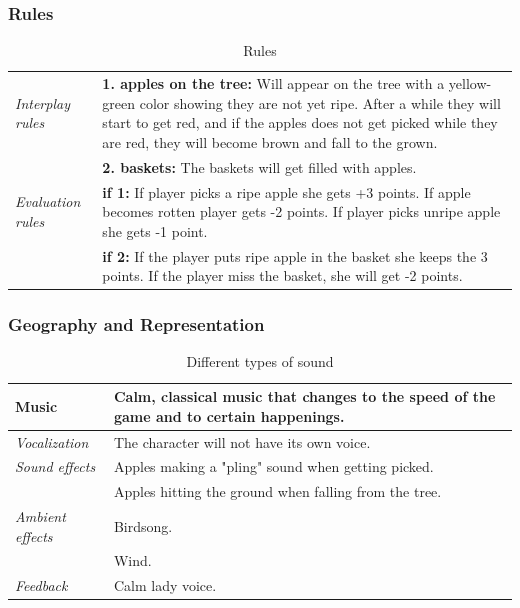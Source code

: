 \subsubsection{Rules} 

\begin{table} [H]
\centering
    \begin{tabular}{|p{}|p{}|}
       \hline
        \emph{Interplay rules} &  \textbf{1. apples on the tree:} Will appear on the tree with a yellow-green color showing they are not yet ripe. After a while they will start to get red, and if the apples does not get picked while they are red, they will become brown and fall to the grown. \\ \cline{2-2}
	     & \textbf{2. baskets:} The baskets will get filled with apples. \\ \hline
	     \emph{Evaluation rules} & \textbf{if 1:} If player picks a ripe apple she gets +3 points. If apple becomes rotten player gets  -2 points. If player picks unripe apple she gets -1 point. \\ \cline{2-2}
	       & \textbf{if 2:} If the player puts ripe apple in the basket she keeps the 3 points. If the player miss the basket, she will get -2 points.  \\ \hline
    \end{tabular}
    \caption[Rules for the "Apple Picking" game]{Rules}
    \label{tab:rules2}
\end{table}  

\subsubsection{Geography and Representation}

\begin{table} [H]
\centering
    \begin{tabular}{|p{}|p{}|}
       \hline
       {Music} & Calm, classical music that changes to the speed of the game and to certain happenings. \\ \hline
       \emph{Vocalization} & The character will not have its own voice. \\ \hline
       \emph{Sound effects} & Apples making a "pling" sound when getting picked.  \\ \cline{2-2}
	    &  Apples hitting the ground when falling from the tree. \\ \hline
	       \emph{Ambient effects} & Birdsong. \\ \cline{2-2}
	         & Wind. \\ \hline
	         \emph{Feedback} & Calm lady voice. \\ \hline
    \end{tabular}
    \caption[Different types of sounds in the "Apple Picking" game]{Different types of sound}
    \label{tab:sound2}
\end{table}  

